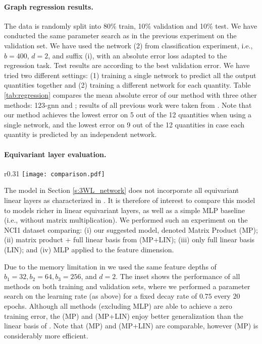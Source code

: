 \documentclass{article}
\newcommand{\ie}{{i.e.}}
\begin{document}
\paragraph{Graph regression results.}  
The data is randomly split into 80\% train, 10\% validation and 10\% test. We have conducted the same parameter search as in the previous experiment on the validation set.  We have used the network (2) from classification experiment, \ie, $b=400$, $d=2$, and suffix (i), with an absolute error loss adapted to the regression task. Test results are according to the best validation error. We have tried two different settings: (1) training a single network to predict all the output quantities together and (2) training a different network for each quantity. Table \ref{tab:regression} compares the mean absolute error of our method with three other methods: 123-gnn \citep{morris2018weisfeiler} and \citep{wu2018moleculenet}; results of all previous work were taken from \citep{morris2018weisfeiler}. Note that our method achieves the lowest error on 5 out of the 12 quantities when using a single network, and the lowest error on 9 out of the 12 quantities in case each quantity is predicted by an independent network. 

\paragraph{Equivariant layer evaluation.} 

\begin{wrapfigure}[19]{r}{0.31\textwidth}\vspace{-15pt}
\texttt{[image: comparison.pdf]}
\end{wrapfigure}
The model in Section \ref{s:3WL_network} does not incorporate all equivariant linear layers as characterized in \citep{maron2018invariant}. It is therefore of interest to compare this model to models richer in linear equivariant layers, as well as a simple MLP baseline (\ie, without matrix multiplication). We performed such an experiment on the NCI1 dataset \citep{Yanardag2015} comparing: (i) our suggested model, denoted Matrix Product (MP); (ii) matrix product + full linear basis from \citep{maron2018invariant} (MP+LIN); (iii) only full linear basis (LIN); and (iv) MLP applied to the feature dimension. 

Due to the memory limitation in \citep{maron2018invariant} we used the same feature depths of $b_1=32, b_2=64, b_3=256$, and $d=2$. The inset shows the performance of all methods on both training and validation sets, where we performed a parameter search on the learning rate (as above) for a fixed decay rate of $0.75$ every $20$ epochs. Although all methods (excluding MLP) are able to achieve a zero training error, the (MP) and (MP+LIN) enjoy better generalization than the linear basis of \cite{maron2018invariant}. Note that (MP) and (MP+LIN) are comparable, however (MP) is considerably more efficient. 
\end{document}
